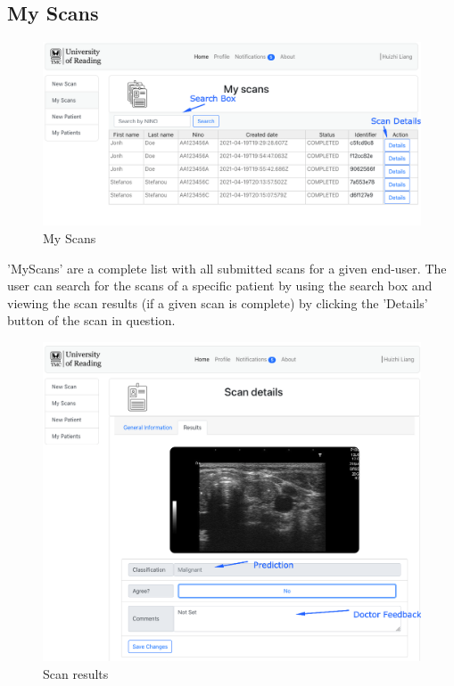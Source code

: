 		\subsection{My Scans}
			\begin{figure}[H]
				\iftrue
				\centering
				\caption{My Scans}
				\includegraphics[scale=0.3]{figures/myscans}
				\fi
			\end{figure}
			'MyScans' are a complete list with all submitted scans for a given end-user. 
			The user can search for the scans of a specific patient by using the search box and viewing the 
			scan results (if a given scan is complete) by clicking the 'Details' button of the scan in question.
			\begin{figure}[H]
				\iftrue
				\centering
				\caption{Scan results}
				\includegraphics[scale=0.3]{figures/myscans-details}
				\fi
			\end{figure}

